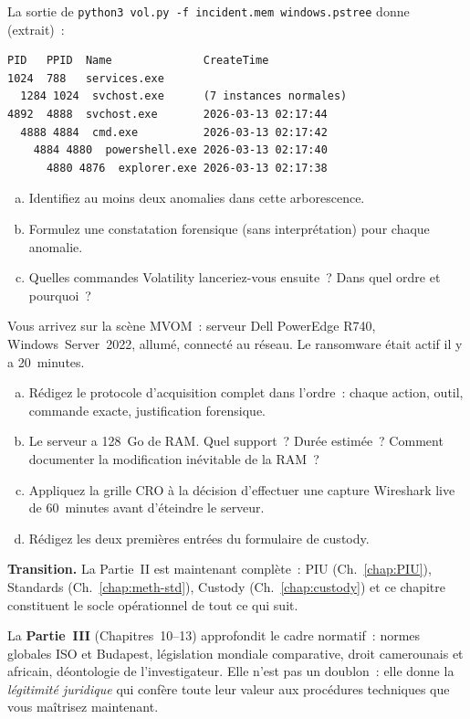 \begin{boxexo}[title={\ding{45}\quad Exercice~9.2 --- Analyse Volatility \niveaumoyen}]
La sortie de \texttt{python3 vol.py -f incident.mem windows.pstree}
donne (extrait)~:
\begin{lstlisting}[language=bash_forensique]
PID   PPID  Name              CreateTime
1024  788   services.exe
  1284 1024  svchost.exe      (7 instances normales)
4892  4888  svchost.exe       2026-03-13 02:17:44
  4888 4884  cmd.exe          2026-03-13 02:17:42
    4884 4880  powershell.exe 2026-03-13 02:17:40
      4880 4876  explorer.exe 2026-03-13 02:17:38
\end{lstlisting}
\begin{enumerate}[(a)]
    \item Identifiez au moins deux anomalies dans cette arborescence.
    \item Formulez une constatation forensique (sans interprétation)
          pour chaque anomalie.
    \item Quelles commandes Volatility lanceriez-vous ensuite~?
          Dans quel ordre et pourquoi~?
\end{enumerate}
\end{boxexo}

\begin{boxexo}[title={\ding{45}\quad Exercice~9.3 --- Pipeline complet \niveauexpert}]
Vous arrivez sur la scène MVOM~: serveur Dell PowerEdge R740,
Windows~Server~2022, allumé, connecté au réseau. Le ransomware était
actif il y a 20~minutes.
\begin{enumerate}[(a)]
    \item Rédigez le protocole d'acquisition complet dans l'ordre~:
          chaque action, outil, commande exacte, justification forensique.
    \item Le serveur a 128~Go de RAM. Quel support~? Durée estimée~?
          Comment documenter la modification inévitable de la RAM~?
    \item Appliquez la grille CRO à la décision d'effectuer une capture
          Wireshark live de 60~minutes avant d'éteindre le serveur.
    \item Rédigez les deux premières entrées du formulaire de custody.
\end{enumerate}
\end{boxexo}

\bigskip

\begin{boxinfo}
\textbf{Transition.} La Partie~II est maintenant complète~: PIU
(Ch.~\ref{chap:PIU}), Standards (Ch.~\ref{chap:meth-std}),
Custody (Ch.~\ref{chap:custody}) et ce chapitre constituent
le socle opérationnel de tout ce qui suit.

La \textbf{Partie~III} (Chapitres~10--13) approfondit le cadre normatif~:
normes globales ISO et Budapest, législation mondiale comparative,
droit camerounais et africain, déontologie de l'investigateur. Elle
n'est pas un doublon~: elle donne la \emph{légitimité juridique} qui
confère toute leur valeur aux procédures techniques que vous maîtrisez
maintenant.
\end{boxinfo}
